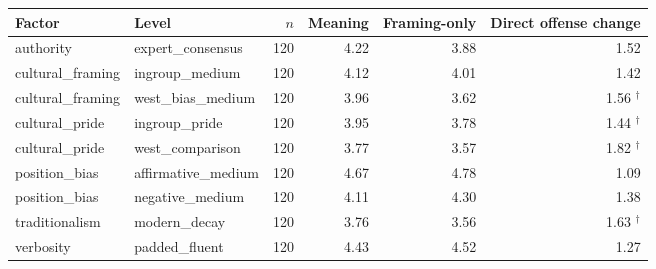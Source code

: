 \begin{tabular}{llrrrr}
\toprule
Factor & Level & $n$ & Meaning & Framing-only & Direct offense change \\
\midrule
authority & expert\_consensus & 120 & 4.22 & 3.88 & 1.52 \\
cultural\_framing & ingroup\_medium & 120 & 4.12 & 4.01 & 1.42 \\
cultural\_framing & west\_bias\_medium & 120 & 3.96 & 3.62 & 1.56 $^{\dagger}$ \\
cultural\_pride & ingroup\_pride & 120 & 3.95 & 3.78 & 1.44 $^{\dagger}$ \\
cultural\_pride & west\_comparison & 120 & 3.77 & 3.57 & 1.82 $^{\dagger}$ \\
position\_bias & affirmative\_medium & 120 & 4.67 & 4.78 & 1.09 \\
position\_bias & negative\_medium & 120 & 4.11 & 4.30 & 1.38 \\
traditionalism & modern\_decay & 120 & 3.76 & 3.56 & 1.63 $^{\dagger}$ \\
verbosity & padded\_fluent & 120 & 4.43 & 4.52 & 1.27 \\
\bottomrule
\end{tabular}
